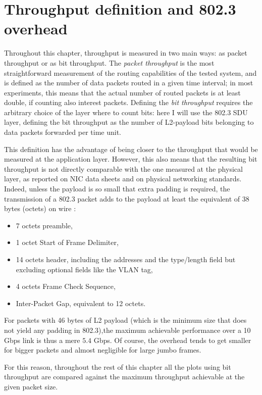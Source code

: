 \documentclass[11pt,a4paper,twoside,titlepage,openany]{book}
\begin{document}
\section{Throughput definition and 802.3 overhead}\label{sec:test.overhead}

Throughout this chapter, throughput is measured in two main ways: as packet throughput or as bit throughput.
The \emph{packet throughput} is the most straightforward measurement of the routing capabilities of the tested system, and is defined as the number of data packets routed in a given time interval; in most experiments, this means that the actual number of routed packets is at least double, if counting also interest packets.
Defining the \emph{bit throughput} requires the arbitrary choice of the layer where to count bits: here I will use the 802.3 \gls{SDU} layer, defining the bit throughput as the number of L2-payload bits belonging to data packets forwarded per time unit.

This definition has the advantage of being closer to the throughput that would be measured at the application layer. However, this also means that the resulting bit throughput is not directly comparable with the one measured at the physical layer, as reported on NIC data sheets and on physical networking standards.
Indeed, unless the payload is so small that extra padding is required, the transmission of a 802.3 packet adds to the payload at least the equivalent of 38 bytes (octets) on wire \cite{ethernet}:
\begin{itemize}[noitemsep,nolistsep]
\item 7 octets preamble,
\item 1 octet Start of Frame Delimiter,
\item 14 octets header, including the addresses and the type/length field but excluding optional fields like the VLAN tag,
\item 4 octets Frame Check Sequence,
\item Inter-Packet Gap, equivalent to 12 octets.
\end{itemize}
For packets with 46 bytes of L2 payload (which is the minimum size that does not yield any padding in 802.3),the maximum achievable performance over a 10 Gbps link is thus a mere $5.4$ Gbps. Of course, the overhead tends to get smaller for bigger packets and almost negligible for large jumbo frames.

For this reason, throughout the rest of this chapter all the plots using bit throughput are compared against the maximum throughput achievable at the given packet size.
\end{document}
